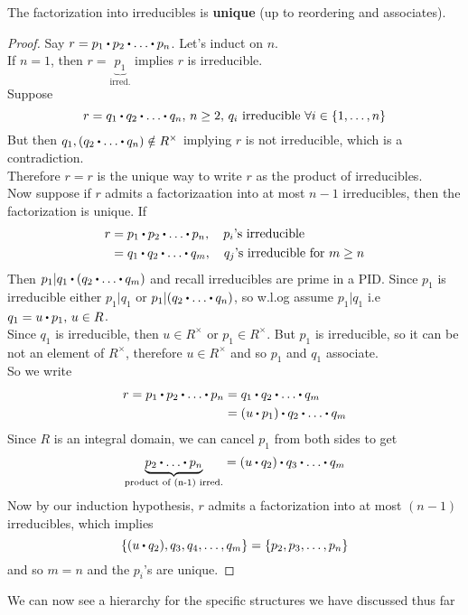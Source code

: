 \documentclass[../Main.tex]{subfiles}
\begin{document}
\begin{lem}[title= Uniqueness]
	The factorization into irreducibles is \textbf{unique} (up to reordering and associates).
\end{lem}
\begin{proof}
	Say $r=p_1\rdot p_2\rdot \dots\rdot p_n$. Let's induct on $n$.\\
	If $n=1$, then $r=\underbrace{p_1}_{\text{irred.}}$ implies $r$ is irreducible.\\
	Suppose
	\[r=q_1\rdot q_2\rdot \dots\rdot q_n,\, n\ge 2,\, q_i \text{ irreducible } \forall i\in \{1,\dots,n\}\]
	But then $q_1,(q_2\rdot \dots\rdot  q_n) \notin R^\times$ implying $r$ is not irreducible, which is a contradiction.\\
	Therefore $r=r$ is the unique way to write $r$ as the product of irreducibles.\\
	Now suppose if $r$ admits a factorizaation into at most $n-1$ irreducibles, then the factorization is unique.
	If
	\begin{align*}
	r&=p_1\rdot p_2\rdot \dots \rdot p_n, \quad p_i\text{'s irreducible}\\
	&=q_1\rdot q_2\rdot \dots\rdot q_m,\quad q_j\text{'s irreducible for } m\ge n
	\end{align*}
	Then $p_1| q_1 \rdot (q_2\rdot \dots\rdot  q_m)$ and recall irreducibles are prime in a PID. Since $p_1$ is irreducible either $p_1| q_1$ or $p_1 | (q_2\rdot \dots\rdot  q_n)$, so w.l.og assume $p_1| q_1$ i.e $q_1=u\rdot p_1,\, u\in R$.\\
	Since $q_1$ is irreducible, then $u\in R^\times $ or $p_1 \in R^\times$. But $p_1$ is irreducible, so it can be not an element of $R^\times$, therefore $u\in R^\times$ and so $p_1$ and $q_1$ associate.\\
	So we write
	\begin{align*}r=p_1\rdot p_2\rdot \dots \rdot p_n&= q_1\rdot q_2 \rdot  \dots \rdot q_m\\
	&=(u\rdot p_1)\rdot q_2\rdot \dots \rdot q_m \end{align*}
	Since $R$ is an integral domain, we can cancel $p_1$ from both sides to get
	\[\underbrace{p_2\rdot \dots \rdot p_n}_{\text{product of (n-1) irred.}} =(u\rdot q_2)\rdot q_3\rdot \dots \rdot q_m \]
	Now by our induction hypothesis, $r$ admits a factorization into at most $(n-1)$ irreducibles, which implies
	\[\{(u\rdot q_2),q_3,q_4,\dots,q_m\}=\{p_2,p_3,\dots,p_n\}\]
	and so $m=n$ and the $p_i$'s are unique.
\end{proof}
We can now see a hierarchy for the specific structures we have discussed thus far
\end{document}
